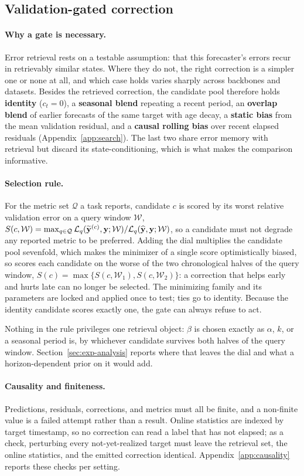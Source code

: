 \subsection{Validation-gated correction}
\label{sec:selection}

\paragraph{Why a gate is necessary.}
Error retrieval rests on a testable assumption: that this forecaster's errors
recur in retrievably similar states. Where they do not, the right correction is a
simpler one or none at all, and which case holds varies sharply across backbones
and datasets. Besides the retrieved correction, the candidate pool therefore holds
\textbf{identity} ($c_t=0$), a \textbf{seasonal blend} repeating a recent period,
an \textbf{overlap blend} of earlier forecasts of the same target with age decay,
a \textbf{static bias} from the mean validation residual, and a \textbf{causal
rolling bias} over recent elapsed residuals (Appendix~\ref{app:search}). The last
two share error memory with retrieval but discard its state-conditioning, which is
what makes the comparison informative.

\paragraph{Selection rule.}
For the metric set $\mathcal{Q}$ a task reports, candidate $c$ is scored by its
worst relative validation error on a query window $\mathcal{W}$,
$S(c,\mathcal{W})=\max_{q\in\mathcal{Q}}
\mathcal{L}_q(\widetilde{\mathbf{y}}^{(c)},\mathbf{y};\mathcal{W})/
\mathcal{L}_q(\widehat{\mathbf{y}},\mathbf{y};\mathcal{W})$,
so a candidate must not degrade any reported metric to be preferred. Adding the
dial multiplies the candidate pool sevenfold, which makes the minimizer of a
single score optimistically biased, so \method{} scores each candidate on the
worse of the two chronological halves of the query window,
$S(c)=\max\{S(c,\mathcal{W}_1),S(c,\mathcal{W}_2)\}$: a correction that helps
early and hurts late can no longer be selected. The minimizing family and its
parameters are locked and applied once to test; ties go to identity. Because the
identity candidate scores exactly one, the gate can always refuse to act.

Nothing in the rule privileges one retrieval object: $\beta$ is chosen exactly as
$\alpha$, $k$, or a seasonal period is, by whichever candidate survives both halves
of the query window. Section~\ref{sec:exp-analysis} reports where that leaves the
dial and what a horizon-dependent prior on it would add.

\paragraph{Causality and finiteness.}
Predictions, residuals, corrections, and metrics must all be finite, and a
non-finite value is a failed attempt rather than a result. Online statistics are
indexed by target timestamp, so no correction can read a label that has not
elapsed; as a check, perturbing every not-yet-realized target must leave the
retrieval set, the online statistics, and the emitted correction identical.
Appendix~\ref{app:causality} reports these checks per setting.

